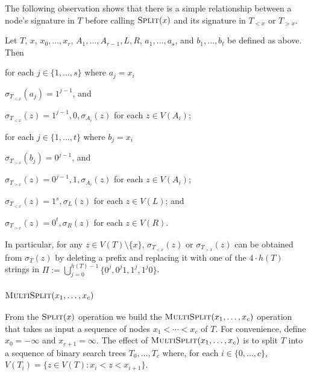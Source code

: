\documentclass[kpfonts]{patmorin}
\begin{document}
The following observation shows that there is a simple relationship between a node's signature in $T$ before calling $\textsc{Split}(x)$ and its signature in $T_{<x}$ or $T_{>x}$.

\begin{obs}
  Let $T$, $x$, $x_0,\ldots,x_r$, $A_1,\ldots,A_{r-1},L,R$, $a_1,\ldots,a_s$, and $b_1,\ldots,b_t$ be defined as above. Then
  \begin{compactenum}
    \item for each $j\in\{1,\ldots,s\}$ where $a_j=x_i$
    \begin{compactenum}
      \item $\sigma_{T_{<x}}(a_j)=1^{j-1}$, and
      \item $\sigma_{T_{<x}}(z) = 1^{j-1},0,\sigma_{A_i}(z)$ for each $z\in V(A_i)$;
    \end{compactenum}
    \item for each $j\in\{1,\ldots,t\}$ where $b_j=x_i$
    \begin{compactenum}
      \item $\sigma_{T_{>x}}(b_j)=0^{j-1}$, and
      \item $\sigma_{T_{>x}}(z) = 0^{j-1},1,\sigma_{A_i}(z)$ for each $z\in V(A_i)$;
    \end{compactenum}
    \item $\sigma_{T_{<x}}(z)=1^s,\sigma_L(z)$ for each $z\in V(L)$; and
    \item $\sigma_{T_{>x}}(z)=0^t,\sigma_R(z)$ for each $z\in V(R)$.
  \end{compactenum}
  In particular, for any $z\in V(T)\setminus\{x\}$, $\sigma_{T_{<x}}(z)$ or $\sigma_{T_{>x}}(z)$ can be obtained from $\sigma_T(z)$ by deleting a prefix and replacing it with one of the $4\cdot h(T)$ strings in $\Pi:=\bigcup_{j=0}^{h(T)-1}\{0^j,0^j1,1^j,1^j0\}$.
\end{obs}

\subsubsection{$\textsc{MultiSplit}(x_1,\ldots,x_c)$}

From the $\textsc{Split}(x)$ operation we build the $\textsc{MultiSplit}(x_1,\ldots,x_c)$ operation that takes as input a sequence of nodes $x_1<\cdots<x_c$ of $T$.  For convenience, define $x_0=-\infty$ and $x_{c+1}=\infty$.  The effect of $\textsc{MultiSplit}(x_1,\ldots,x_c)$ is to split $T$ into a sequence of binary search trees $T_0,\ldots,T_{c}$ where, for each $i\in\{0,\ldots,c\}$, $V(T_i)=\{z\in V(T): x_i< z<x_{i+1}\}$.
\end{document}
